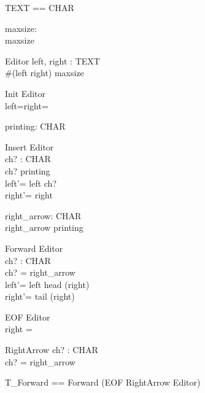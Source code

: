 \documentclass{llncs}
\begin{document}
\begin{zed}
[CHAR]
\end{zed}
\begin{zed}
TEXT == \seq CHAR
\end{zed}
\begin{axdef}
maxsize: \nat\\
\where maxsize 
\end{axdef}
\begin{schema}{Editor}
left, right : TEXT\\
\where \#(left \cat right) \leq maxsize
\end{schema}
\begin{schema}{Init}
Editor\\
\where left=right=\langle \rangle
\end{schema}
\begin{axdef}
printing: \power CHAR
\end{axdef}
\begin{schema}{Insert}
\Delta Editor \\
ch? : CHAR\\
\where ch? \in printing \\
left'= left \cat \langle ch? \rangle\\
right'= right
\end{schema}
\begin{axdef}
right\_arrow: CHAR \\
\where right\_arrow \notin printing
\end{axdef}
\begin{schema}{Forward}
\Delta Editor \\
ch? : CHAR \\
\where ch? = right\_arrow \\
left'= left \cat \langle head (right) \rangle \\
right'= tail (right)
\end{schema}
\begin{schema}{EOF}
Editor \\
\where right = \langle \rangle
\end{schema}
\begin{schema}{RightArrow}
ch? : CHAR \\
\where ch? = right\_arrow
\end{schema}
\begin{zed}
T\_Forward == Forward \lor (EOF \land RightArrow \land \Xi
Editor)
\end{zed}
\end{document}
